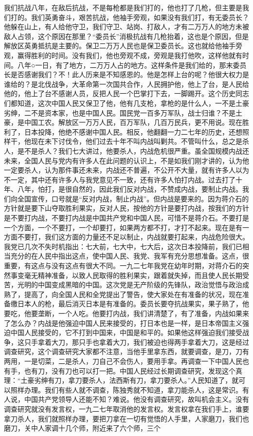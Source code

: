我们抗战八年，在敌后抗战，不是每枪都是我们打的，他也打了几枪，但主要是我们打的。我们英勇奋斗，艰苦抗战，他袖手旁观，如果没有我们打，有无委员长？他躲在山上，有人给他守卫，我们守卫、站岗、打敌人，才有二万万人的地方未被敌人占领，这个原因在那里？“委员长”消极抗战有几枪抬着，这也是个原因，但是解放区英勇抵抗是主要的。保卫二万万人民也是保卫委员长。这也就给他袖手旁观，赢得胜利的时间。没有我们，他也旁观不成，旁观是我打他吹，这样他就有时间。八年○一日，有了地方，二万万人占的地方。这样条件是我们给的，那末委员长是否感谢我们？不！此人历来是不知感恩的。他是怎样上台的呢？他很大权力是谁给的？是北伐战争，大革命第一次国共合作，人民拥护他，他上了台，是人民给他的，他上了台不感谢人员，反把人民一个巴掌打下去，一脚踢开。这个历史同志们都知道，这次中国人民又保卫了他，他有几支枪，拿枪的是什么人，一不是土豪劣绅，二不是资本家，也是中国人民。国民党一百多万军队，战士归谁？不是土豪，是中国工农。解放区一万万人民，百万军队，几百万民兵，更不用说。现在胜利了，日本投降，他绝不感谢中国人民。相反，他翻翻一力二七年的历史，还想照样干，他现在未下讨伐令，他们过去十年不叫内战叫剿共。不管叫什么，总之是杀人，是不是杀人？我们七大讲过，他要杀人，内战危机很严重。虽全国规模内战还未来，全国人民与党内有许多人在此问题的认识上，不是如我们刚才讲的，认为他一定要杀人，认为那件事还未来，内战还不普遍，不公开不大量，就有许多人以为不一定，其中还有许多人与我党意见不一致，还有许多人怕打内战。过去打了十年、八年，怕打，是很自然的，因此我们反对内战，不赞成内战，要制止内战。我们向全国宣传，口号就是“反对内战，制止内战”。但内战是要来的。因为蒋介石的方针就是要下山夺取胜利果实，反对人民，按他的方针是要打内战，按我们的方针是不要打内战，不要打内战是中国共产党和中国人民，可惜不是蒋介石。不要打是一个方面，一个不要打，一个却要打，如果两方都不打，才打不起来。现在是有一方面不要打，我们这方面的力量还不足以制止，内战就要打起来，内战危险很大。我党已几次不失时机指出：七大前，七大中，七大后，这次日本投降前，我们已相当充分的在人民中指出这点，使中国人民、我党、我军有充分思想准备。这点，很重要，有这点与没有这点有很大不同。一九二七年我党在幼年时期，对蒋介石的突然事变毫无精神准备，以致人民取得的胜利果实，跟着就失掉，而且使人民长期受苦，光明的中国变成黑暗的中国。这次党是无产阶级的先锋队，政治觉悟与政治成熟了，提高了，向全国人民和全党提出了警告，使大家处在有准备的状况，现在准备缴日本人的枪，最后消灭日本是有准备的。委员长要夺抗战果实，果子熟了，他要吃，他要垄断，一个人吃。他要打内战，我们讲清楚了，有了准备，内战如果来了怎么办？内战是他强迫中国人民来接受的，打日本也是一样，是日本帝国主义强迫中国人民接受的，它不打到中国来，中国是和平的。如果他这样强迫我们接受战争，这只手拿着大刀，那只手也拿着大刀，我们被迫也得两手拿着大刀，这是经过调查研究，这个调查研究大家都不注意，当他手里拿东西，就要调查，是刀，刀有两用，一是切菜，二是杀人，刀自己不会伤人，要用手拿。再调查一下中国人民也有手，也有刀，没有刀也可以打一把。中国人民经过长期调查研究，发现这个真理：“土豪劣绅有刀，拿刀要杀人，法西斯有刀，拿刀要杀人。”人民知道了，就可以照样办理。我们有些人就不调查，陈独秀就不知道，拿刀能杀人，这是常识。有人说，中国共产党领导人还能不知？难说。他没有调查研究，故叫机会主义。没有调查研究就没有发言权，一九二七年取消他的发言权。发言权拿在我们手上，谁要拿刀杀人，我们就照样办理，要把刀拿在一切有觉悟的人手里，人家磨刀，我们也磨刀，关中人家调十几个师，附近来了六个师，三个